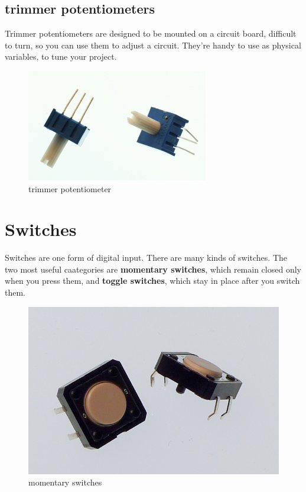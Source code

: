 \subsection{trimmer potentiometers}
Trimmer potentiometers are designed to be mounted on a circuit board, difficult to turn, so you can use them to adjust a circuit. They're handy to use as physical variables, to tune your project. 

\begin{figure}[!htb]
     \centering
     \includegraphics[scale=0.3]{img/components/pots_trimmer.jpg}
     \caption{trimmer potentiometer}
     \label{trimmer potentiometer}
\end{figure}

\section{Switches}

Switches are one form of digital input. There are many kinds of switches. The two most useful caategories are \textbf{momentary switches}, which remain closed only when you press them, and \textbf{toggle switches}, which stay in place after you switch them. 

\begin{figure}[!htb]
     \centering
     \includegraphics[scale=0.3]{img/components/switches_momentary.jpg}
     \caption{momentary switches}
     \label{momentary switches}
\end{figure}

